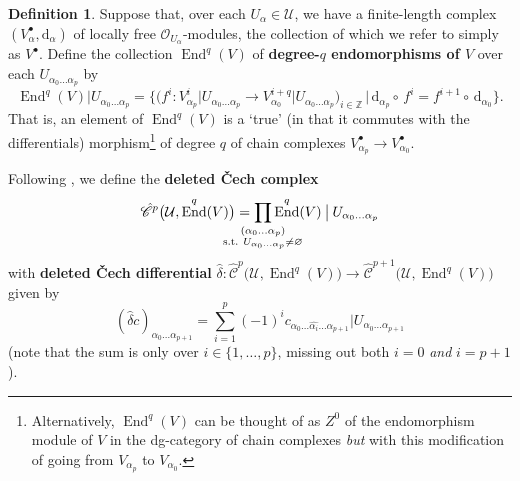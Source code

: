 \documentclass[11pt,fleqn]{article}
\theoremstyle{plain}
\theoremstyle{definition}
\newtheorem{definition}[theorem]{Definition}
\theoremstyle{remark}
\numberwithin{equation}{theorem}
\newcommand{\cover}{\mathcal{U}}
\newcommand{\OO}{\mathcal{O}}
\newcommand{\restricted}{\mathbin{\big\vert}}
\newcommand{\cechd}{\hat{\mathscr{C}}}
\newcommand{\define}[1]{\textbf{#1}}
\renewcommand{\d}{\mathrm{d}}
\DeclareMathOperator{\End}{End}
\begin{document}
        \begin{definition}\label{definition:deleted-cech-etc}
            Suppose that, over each $U_\alpha\in\cover$, we have a finite-length complex $(V_\alpha^\bullet,\d_\alpha)$ of locally free $\OO_{U_\alpha}$-modules, the collection of which we refer to simply as $V^\bullet$.
            Define the collection $\End^q(V)$ of \define{degree-$q$ endomorphisms of $V$} over each $U_{\alpha_0\ldots\alpha_p}$ by
            \begin{equation*}
                \End^q(V)\restricted{U_{\alpha_0\ldots\alpha_p}} = \Big\{\big(f^i\colon V_{\alpha_p}^i\restricted{U_{\alpha_0\ldots\alpha_p}}\to V_{\alpha_0}^{i+q}\restricted{U_{\alpha_0\ldots\alpha_p}}\big)_{i\in\mathbb{Z}} \,\Big|\, \d_{\alpha_p}\circ\,f^i = f^{i+1}\circ\,\d_{\alpha_0}\Big\}.
            \end{equation*}
            That is, an element of $\End^q(V)$ is a `true' (in that it commutes with the differentials) morphism\footnote{Alternatively, $\End^q(V)$ can be thought of as $Z^0$ of the endomorphism module of $V$ in the dg-category of chain complexes \emph{but} with this modification of going from $V_{\alpha_p}$ to $V_{\alpha_0}$.} of degree $q$ of chain complexes $V_{\alpha_p}^\bullet\to V_{\alpha_0}^\bullet$.

            Following \cite[0.A]{Green1980}, we define the \define{deleted Čech complex}
            \begin{equation*}
                \cechd^p\big(\cover,\End^q(V)\big)
                =
                \smashoperator{\prod_{\substack{(\alpha_0\ldots\alpha_p)\\\text{s.t. }U_{\alpha_0\ldots\alpha_p}\neq\varnothing}}}
                \End^q(V)\restricted {U_{\alpha_0\ldots\alpha_p}}
            \end{equation*}
            with \define{deleted Čech differential} $\hat{\delta}\colon\cechd^p\big(\cover,\End^q(V)\big) \to \cechd^{p+1}\big(\cover,\End^q(V)\big)$ given by
                \begin{equation*}
                    (\hat{\delta}c)_{\alpha_0\ldots\alpha_{p+1}} = \sum_{i=1}^p(-1)^ic_{\alpha_0\ldots\widehat{\alpha_i}\ldots\alpha_{p+1}}\restricted {U_{\alpha_0\ldots\alpha_{p+1}}}
                \end{equation*}
            (note that the sum is only over $i\in\{1,\ldots,p\}$, missing out both $i=0$ \textit{and} $i=p+1$).
        \end{definition}
\end{document}
